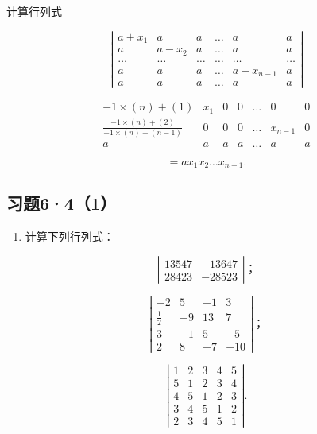 计算行列式

\[
\left| \begin{array}{cccccc} a + x _ {1} & a & a & \dots & a & a \\ a & a - x _ {2} & a & \dots & a & a \\ \dots & \dots & \dots & \dots & \dots & \dots \\ a & a & a & \dots & a + x _ {n - 1} & a \\ a & a & a & \dots & a & a \end{array} \right|
\]

\[
\begin{array}{ccccccc} - 1 \times (n) + (1) & x _ {1} & 0 & 0 & \dots & 0 & 0 \\ \frac {- 1 \times (n) + (2)}{- 1 \times (n) + (n - 1)} & 0 & 0 & 0 & \dots & x _ {n - 1} & 0 \\ a & a & a & a & \dots & a & a \end{array}
\]

\[
= a x _ {1} x _ {2} \dots x _ {n - 1}.
\]

\subsection{习题6·4（1）}

\begin{enumerate}
\item
  计算下列行列式：
\end{enumerate}

\[
\left| \begin{array}{ll} 13547 & - 13647 \\ 28423 & - 28523 \end{array} \right|\text{；} \tag {1}
\]

\[
\left| \begin{array}{cccc} - 2 & 5 & - 1 & 3 \\ \frac {1}{2} & - 9 & 13 & 7 \\ 3 & - 1 & 5 & - 5 \\ 2 & 8 & - 7 & - 10 \end{array} \right|\text{；} \tag {2}
\]

\[
\left| \begin{array}{ccccc} 1 & 2 & 3 & 4 & 5 \\ 5 & 1 & 2 & 3 & 4 \\ 4 & 5 & 1 & 2 & 3 \\ 3 & 4 & 5 & 1 & 2 \\ 2 & 3 & 4 & 5 & 1 \end{array} \right|. \tag {3}
\]

